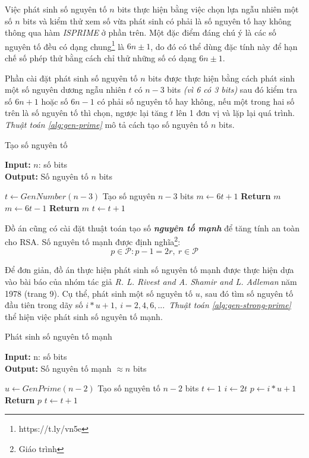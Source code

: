 Việc phát sinh số nguyên tố $n$ bits thực hiện bằng việc chọn lựa ngẫu nhiên một số $n$ bits và kiểm thử xem số vừa phát sinh có phải là số nguyên tố hay không 
thông qua hàm \textit{ISPRIME} ở phần trên. Một đặc điểm đáng chú ý là các số nguyên tố đều có dạng chung\footnote{https://t.ly/vn5e} là  $6n \pm 1$, do đó có thể dùng đặc tính này để hạn chế số phép 
thử bằng cách chỉ thử những số có dạng $6n \pm 1$.

Phần cài đặt phát sinh số nguyên tố $n$ bits được thực hiện bằng cách phát sinh một số nguyên dương ngẫu nhiên $t$ có $n-3$ bits \textit{(vì 6 có 3 bits)} sau đó kiểm tra số 
$6n + 1$ hoặc số $6n - 1$ có phải số nguyên tố hay không, nếu một trong hai số trên là số nguyên tố thì chọn, ngược lại tăng $t$ lên 1 đơn vị và lặp lại quá trình. 
\textit{Thuật toán \ref{alg:gen-prime}} mô tả cách tạo số nguyên tố $n$ bits.

\begin{algorithm} [H]
\caption{Tạo số nguyên tố}\label{alg:gen-prime}
\hspace*{\algorithmicindent} \textbf{Input:} $n$: số bits\\
\hspace*{\algorithmicindent} \textbf{Output:} Số nguyên tố $n$ bits 
\begin{algorithmic}[1]
\State $t \gets GenNumber(n-3)$ \Comment Tạo số nguyên $n-3$ bits
\State $m \gets 6t + 1$
\State \textbf{Return } $m$
\EndIf
\State $m \gets 6t - 1$
\State \textbf{Return } $m$
\EndIf
\State $t \gets t + 1$
\EndWhile
\EndProcedure
\end{algorithmic}
\end{algorithm}

Đồ án cũng có cài đặt thuật toán tạo số \textbf{\textit{nguyên tố mạnh}} để tăng tính an toàn cho RSA. Số nguyên tố mạnh được định nghĩa\footnote{Giáo trình}:
\[ p \in \mathcal{P}: p - 1 = 2r,\ r \in \mathcal{P} \]

Để đơn giản, đồ án thực hiện phát sinh số nguyên tố mạnh được thực hiện dựa vào bài báo \cite{Rivest1978} của nhóm tác giả \textit{R. L. Rivest and 
A. Shamir and L. Adleman} năm 1978 (trang 9). Cụ thể, phát sinh một số nguyên tố $u$, sau đó tìm số nguyên tố đầu tiên trong dãy số $i*u + 1,\ i=2,4,6,...$\ \textit{Thuật toán \ref{alg:gen-strong-prime}} 
thể hiện việc phát sinh số nguyên tố mạnh.

\begin{algorithm} [H]
\caption{Phát sinh số nguyên tố mạnh}\label{alg:gen-strong-prime}
\hspace*{\algorithmicindent} \textbf{Input:} n: số bits\\
\hspace*{\algorithmicindent} \textbf{Output:} Số nguyên tố mạnh $\approx n$ bits 
\begin{algorithmic}[1]
\State $u \gets GenPrime(n-2)$ \Comment Tạo số nguyên tố $n-2$ bits
\State $t \gets 1$
\State $i \gets 2t$
\State $p \gets i*u + 1$
\State \textbf{Return } $p$
\EndIf
\State $t \gets t + 1$
\EndWhile
\EndProcedure
\end{algorithmic}
\end{algorithm}

